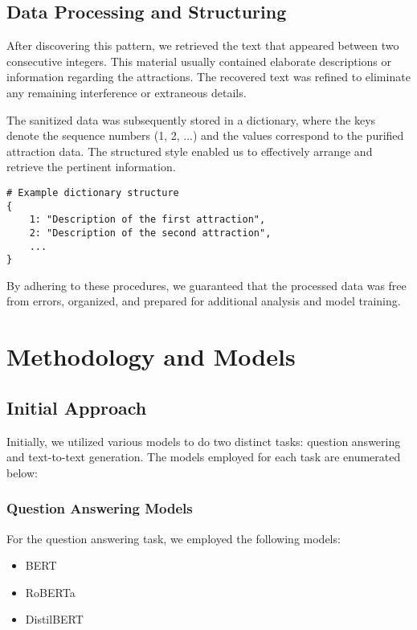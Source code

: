 \documentclass[conference]{IEEEtran}
\begin{document}
    \subsection{Data Processing and Structuring}
    After discovering this pattern, we retrieved the text that appeared between two consecutive integers. This material usually contained elaborate descriptions or information regarding the attractions. The recovered text was refined to eliminate any remaining interference or extraneous details.

    The sanitized data was subsequently stored in a dictionary, where the keys denote the sequence numbers (1, 2, ...) and the values correspond to the purified attraction data. The structured style enabled us to effectively arrange and retrieve the pertinent information.

    \begin{verbatim}
# Example dictionary structure
{
    1: "Description of the first attraction",
    2: "Description of the second attraction",
    ...
}
    \end{verbatim}

    By adhering to these procedures, we guaranteed that the processed data was free from errors, organized, and prepared for additional analysis and model training.

\section{Methodology and Models}

    \subsection{Initial Approach}

        Initially, we utilized various models to do two distinct tasks: question answering and text-to-text generation. The models employed for each task are enumerated below:

        \subsubsection{Question Answering Models}

        For the question answering task, we employed the following models:
        \begin{itemize}
            \item BERT
            \item RoBERTa
            \item DistilBERT
        \end{itemize}
\end{document}
